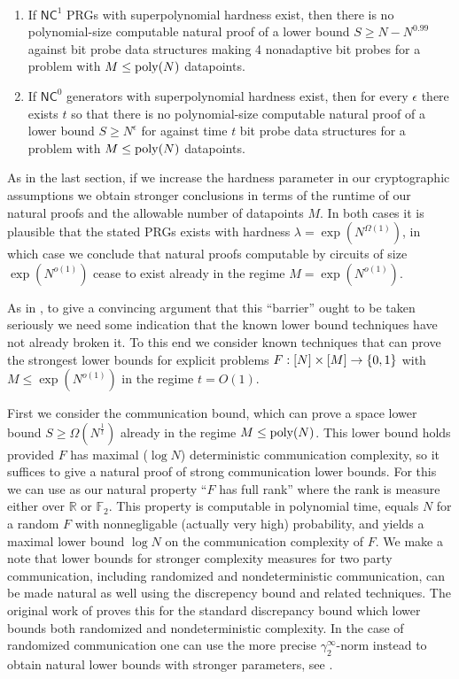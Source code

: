 \begin{theorem*}
~\begin{enumerate}
    \item If $\mathsf{NC}^1$ PRGs with superpolynomial hardness exist, then there is no polynomial-size computable natural proof of a lower bound $S \geq N - N^{0.99}$ against bit probe data structures making 4 nonadaptive bit probes for a problem with $M \leq \mathrm{poly}(N)$ datapoints.
    \item If $\mathsf{NC}^0$ generators with superpolynomial hardness exist, then for every $\epsilon$ there exists $t$ so that there is no polynomial-size computable natural proof of a lower bound $S \geq N^\epsilon$ for against time $t$ bit probe data structures for a problem with $M \leq \mathrm{poly}(N)$ datapoints.
\end{enumerate}
\end{theorem*}
As in the last section, if we increase the hardness parameter in our cryptographic assumptions we obtain stronger conclusions in terms of the runtime of our natural proofs and the allowable number of datapoints $M$. In both cases it is plausible that the stated PRGs exists with hardness $\lambda = \exp(N^{\Omega(1)})$, in which case we conclude that natural proofs computable by circuits of size $\exp(N^{o(1)})$ cease to exist already in the regime $M = \exp(N^{o(1)})$.

As in \cite{natural-proofs}, to give a convincing argument that this ``barrier'' ought to be taken seriously we need some indication that the known lower bound techniques have not already broken it. To this end we consider known techniques that can prove the strongest lower bounds for explicit problems $F: [N] \times [M] \to \{0,1\}$ with $M \leq \exp(N^{o(1)})$ in the regime $t = O(1)$. 

First we consider the communication bound, which can prove a space lower bound $S \geq \Omega(N^{\frac{1}{t}})$ already in the regime $M \leq \mathrm{poly}(N)$. This lower bound holds provided $F$ has maximal ($\log N$) deterministic communication complexity, so it suffices to give a natural proof of strong communication lower bounds. For this we can use as our natural property ``$F$ has full rank'' where the rank is measure either over $\mathbb{R}$ or $\mathbb{F}_2$. This property is computable in polynomial time, equals $N$ for a random $F$ with nonnegligable (actually very high) probability, and yields a maximal lower bound $\log N$ on the communication complexity of $F$. We make a note that lower bounds for stronger complexity measures for two party communication, including randomized and nondeterministic communication, can be made natural as well using the discrepency bound and related techniques. The original work of \cite{natural-proofs} proves this for the standard discrepancy bound which lower bounds both randomized and nondeterministic complexity. In the case of randomized communication one can use the more precise $\gamma_2^\infty$-norm instead to obtain natural lower bounds with stronger parameters, see \cite{linial2007lower}.

